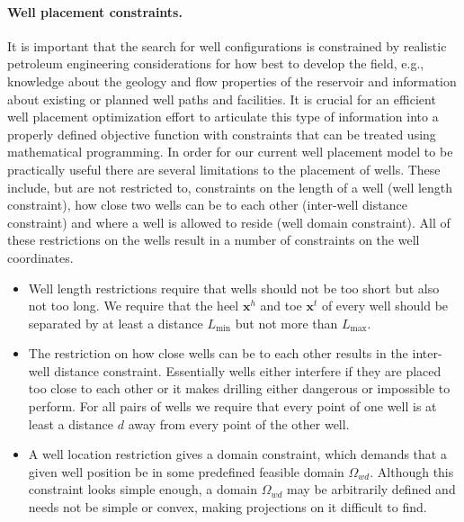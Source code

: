 \paragraph{Well placement constraints.}
% 
It is important that the search for well configurations
is constrained by realistic petroleum engineering 
considerations for how best to develop the field, 
e.g., knowledge about the geology and flow properties
of the reservoir and information about existing or
planned well paths and facilities.
% 
It is crucial for an efficient well placement optimization
effort to articulate this type of information into a
properly defined objective function with constraints
that can be treated using mathematical programming.
%
In order for our current well placement model 
to be practically useful there are several 
limitations to the placement of wells. 
%
These include, but are not restricted to, constraints 
on the length of a well (well length constraint), 
how close two wells can be to each other (inter-well 
distance constraint) and where a well is allowed to 
reside (well domain constraint).
%
All of these restrictions on the wells result in 
a number of constraints on the well coordinates.\\
%
%
\begin{itemize}
	\item Well length restrictions require that wells should not be too short
	but also not too long. We require that the heel $\textbf{x}^h$ and toe
	$\textbf{x}^t$ of every well should be separated by at least a distance
	$L_{\min}$ but not more than $L_{\max}$.
	\item The restriction on how close wells can be to each other results in the inter-well distance
	constraint. Essentially wells either interfere if they are placed too close to each other
	or it makes drilling either dangerous or impossible to perform. For all pairs of wells we require
	that every point of one well is at least a distance $d$ away from every point of the other
	well.
%
	\item A well location restriction gives a domain constraint, which demands that
	a given well position be in some predefined feasible domain $\Omega_{wd}$.
	Although this constraint looks simple enough, a domain
	$\Omega_{wd}$ may be arbitrarily defined and needs not be simple or convex, making 
	projections on it difficult to find.
\end{itemize}
%
%
